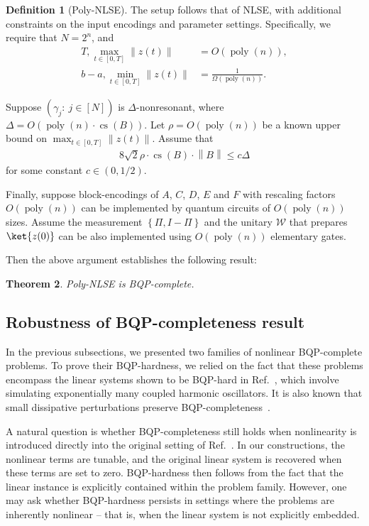 \documentclass[superscriptaddress,onecolumn,nofootinbib,longbibliography,a4paper,accepted=2026-09-29]{quantumarticle}
\theoremstyle{plain}
\newtheorem{thm}{Theorem}
\theoremstyle{definition}
\newtheorem{definition}[thm]{Definition}
\numberwithin{thm}{section}
\numberwithin{assumption}{section}
\numberwithin{lemma}{section}
\numberwithin{prop}{section}
\numberwithin{cor}{section}
\numberwithin{definition}{section}
\numberwithin{rmk}{section}
\numberwithin{equation}{section}
\newcommand{\norm}[1]     {\left\| #1 \right\|}
\newcommand{\lrb}[1]{\left ( #1 \right )}
\newcommand{\lrcb}[1]{\left \{ #1 \right \}}
\newcommand{\mypoly}[1]{\operatorname{poly} \lrb{#1}}
\newcommand{\myO}[1]{O\lrb{#1}}
\newcommand{\myOmega}[1]{\Omega\lrb{#1}}
\begin{document}
\begin{definition}[Poly-NLSE]
The setup follows that of NLSE, with additional constraints on the input encodings and parameter settings. Specifically, we require that $N=2^n$, and
\begin{align}
T, \max_{t\in [0, T]} \norm{z(t)}
&=\myO{\mypoly{n}}, \\    
b-a, \min_{t\in [0, T]} \norm{z(t)}&=\frac{1}{\myOmega{\mypoly{n}}}.
\end{align} 
    

Suppose $\lrb{\gamma_j:~j\in [N]}$ is $\Delta$-nonresonant, where $\Delta=\myO{\mypoly{n} \cdot \operatorname{cs}(B)}$. Let $\rho=\myO{\mypoly{n}}$ be a known upper bound on $\max_{t \in [0, T]} \norm{z(t)}$. Assume that
\begin{align}
    8 \sqrt{2} \rho \cdot \operatorname{cs}(B)\cdot \norm{B} \le c\Delta
\end{align}
for some constant $c \in (0, 1/2)$.

Finally, suppose block-encodings of $A$, $C$, $D$, $E$ and $F$ with rescaling factors $\myO{\mypoly{n}}$ can be implemented by quantum circuits of $\myO{\mypoly{n}}$ sizes. Assume the measurement $\lrcb{\Pi, I-\Pi}$ and the unitary $\mathcal{W}$ that prepares $\ket{z(0)}$ can be  also implemented using $\myO{\mypoly{n}}$ elementary gates.
\end{definition}

Then the above argument establishes the following result:
\begin{thm}
Poly-NLSE is BQP-complete.    
\end{thm}


\subsection{Robustness of BQP-completeness result}
\label{subsec:bqphard}


In the previous subsections, we presented two families of nonlinear BQP-complete problems. To prove their BQP-hardness, we relied on the fact that these problems encompass the linear systems shown to be BQP-hard in Ref.~\cite{babbush2023exponential}, which involve simulating exponentially many coupled harmonic oscillators. It is also known that small dissipative perturbations preserve BQP-completeness~\cite{krovi2024quantum}.

A natural question is whether BQP-completeness still holds when nonlinearity is introduced directly into the original setting of Ref.~\cite{babbush2023exponential}. In our constructions, the nonlinear terms are tunable, and the original linear system is recovered when these terms are set to zero. BQP-hardness then follows from the fact that the linear instance is explicitly contained within the problem family. However, one may ask whether BQP-hardness persists in settings where the problems are inherently nonlinear -- that is, when the linear system is not explicitly embedded.
\end{document}
